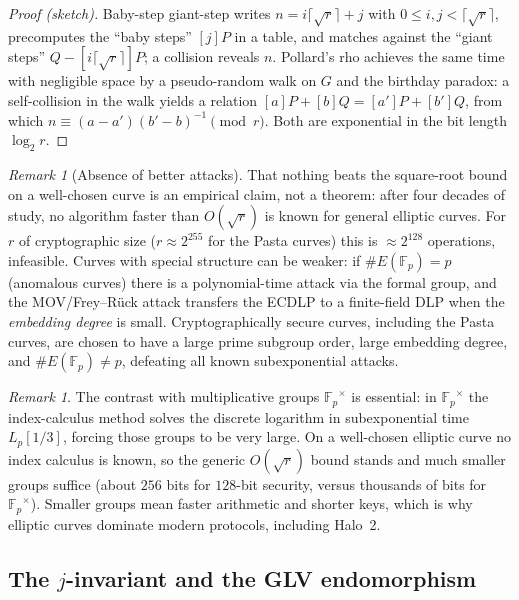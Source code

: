 \documentclass[11pt,a4paper]{article}
\theoremstyle{definition}
\theoremstyle{remark}
\newtheorem{remark}[theorem]{Remark}
\newcommand{\Fp}{\ensuremath{\mathbb{F}_{p}}}
\begin{document}
\begin{proof}[Proof (sketch)]
Baby-step giant-step writes \(n = i\lceil\sqrt r\rceil + j\) with \(0 \le i, j < \lceil\sqrt r\rceil\), precomputes the ``baby steps'' \([j]P\) in a table, and matches against the ``giant steps'' \(Q - [i\lceil\sqrt r\rceil]P\); a collision reveals \(n\). Pollard's rho achieves the same time with negligible space by a pseudo-random walk on \(G\) and the birthday paradox: a self-collision in the walk yields a relation \([a]P + [b]Q = [a']P + [b']Q\), from which \(n \equiv (a - a')(b' - b)^{-1} \pmod r\). Both are exponential in the bit length \(\log_2 r\).
\end{proof}

\begin{remark}[Absence of better attacks]\label{ellipticcurves:rem-ecdlp-hardness}
That nothing beats the square-root bound on a well-chosen curve is an empirical claim, not a theorem: after four decades of study, no algorithm faster than \(O(\sqrt r)\) is known for general elliptic curves. For \(r\) of cryptographic size (\(r \approx 2^{255}\) for the Pasta curves) this is \(\approx 2^{128}\) operations, infeasible. Curves with special structure can be weaker: if \(\#E(\Fp) = p\) (anomalous curves) there is a polynomial-time attack via the formal group, and the MOV/Frey--Rück attack transfers the ECDLP to a finite-field DLP when the \emph{embedding degree} is small. Cryptographically secure curves, including the Pasta curves, are chosen to have a large prime subgroup order, large embedding degree, and \(\#E(\Fp) \neq p\), defeating all known subexponential attacks.
\end{remark}

\begin{remark}\label{ellipticcurves:rem-index-calculus}
The contrast with multiplicative groups \(\Fp^{\times}\) is essential: in \(\Fp^{\times}\) the index-calculus method solves the discrete logarithm in subexponential time \(L_p[1/3]\), forcing those groups to be very large. On a well-chosen elliptic curve no index calculus is known, so the generic \(O(\sqrt r)\) bound stands and much smaller groups suffice (about \(256\) bits for \(128\)-bit security, versus thousands of bits for \(\Fp^{\times}\)). Smaller groups mean faster arithmetic and shorter keys, which is why elliptic curves dominate modern protocols, including Halo~2.
\end{remark}

\subsection{The \(j\)-invariant and the GLV endomorphism}
\end{document}

